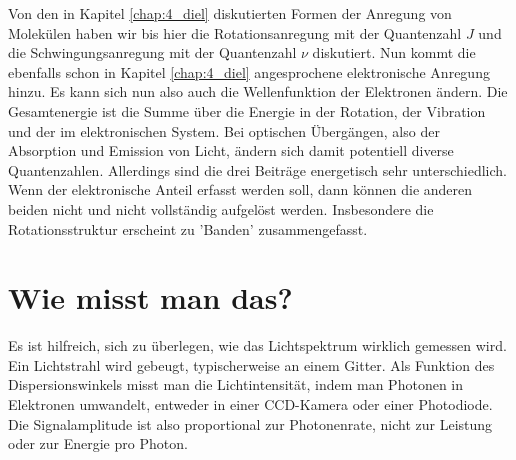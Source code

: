 Von den in Kapitel \ref{chap:4_diel} diskutierten Formen der Anregung von Molekülen haben wir bis hier die Rotationsanregung mit der Quantenzahl $J$ und die Schwingungsanregung mit der Quantenzahl $\nu$ diskutiert. Nun kommt die ebenfalls schon in Kapitel  \ref{chap:4_diel} angesprochene elektronische Anregung hinzu. Es kann sich nun also auch die Wellenfunktion der Elektronen ändern. Die Gesamtenergie ist die Summe über die Energie in der Rotation, der Vibration und der im elektronischen System. Bei optischen Übergängen, also der Absorption und Emission von Licht, ändern sich damit potentiell diverse Quantenzahlen. Allerdings sind die drei Beiträge energetisch sehr unterschiedlich. Wenn der elektronische Anteil erfasst werden soll, dann können die anderen beiden nicht und nicht vollständig aufgelöst werden. Insbesondere die Rotationsstruktur erscheint zu 'Banden' zusammengefasst.



\section{Wie misst man das?}


Es ist hilfreich, sich zu überlegen, wie das Lichtspektrum wirklich gemessen wird. Ein Lichtstrahl wird gebeugt, typischerweise an einem Gitter. Als Funktion des Dispersionswinkels misst man die Lichtintensität, indem man Photonen in Elektronen umwandelt, entweder in einer CCD-Kamera oder einer Photodiode. Die Signalamplitude ist also proportional zur Photonenrate, nicht zur Leistung oder zur Energie pro Photon.

